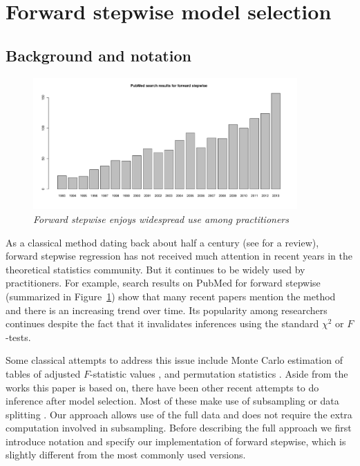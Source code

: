 \documentclass{imsart}
\begin{document}
\section{Forward stepwise model selection}
\label{sec:stepwise}

\subsection{Background and notation}

\begin{figure}
\begin{center}
\includegraphics[width=0.9\textwidth]{../figs/pubmed.pdf}
\caption{\small \it Forward stepwise enjoys widespread use among
practitioners}
\label{fig:pubmed}
\end{center}
\end{figure}


As a classical method dating back about half a century
(see \cite{classical:selection} for a review),
forward stepwise regression has not received much attention in
recent years in the theoretical statistics community. But it continues
to be widely used by practitioners.
For example, search results on PubMed for forward stepwise
(summarized in Figure~\ref{fig:pubmed}) show that many recent
papers mention the method and there is an increasing trend over time.
Its popularity among researchers continues despite the fact that it
invalidates inferences using the standard $\chi^2$ or $F$-tests.


Some classical attempts to address this issue include Monte Carlo
estimation of tables of adjusted $F$-statistic values \citep{mc:ftoenter},
and permutation statistics \citep{permutation:stop}. Aside from the works
this paper is based on, there have been other recent attempts to do
inference after model selection. Most of these make use of subsampling
\citep{meinshausen:buhlmann} or data splitting \citep{wasserman:roeder}.
Our approach allows use of the full data and does not require the
extra computation involved in subsampling.
Before describing the full approach we first introduce notation and
specify our implementation of forward stepwise, which is slightly
different from the most commonly used versions.
\end{document}

